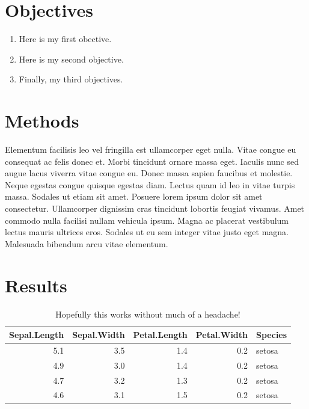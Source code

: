 \documentclass[article,30pt,extrafontsizes]{memoir}
\begin{document}
\begin{adjmulticols*}{3}{10mm}{10mm}
{\section{Objectives}\label{objectives}

\large

\begin{enumerate}
\def\labelenumi{\arabic{enumi}.}
\tightlist
\item
  Here is my first obective.
\item
  Here is my second objective.
\item
  Finally, my third objectives.
\end{enumerate}

\small

\section{Methods}\label{methods}

Elementum facilisis leo vel fringilla est ullamcorper eget nulla. Vitae
congue eu consequat ac felis donec et. Morbi tincidunt ornare massa
eget. Iaculis nunc sed augue lacus viverra vitae congue eu. Donec massa
sapien faucibus et molestie. Neque egestas congue quisque egestas diam.
Lectus quam id leo in vitae turpis massa. Sodales ut etiam sit amet.
Posuere lorem ipsum dolor sit amet consectetur. Ullamcorper dignissim
cras tincidunt lobortis feugiat vivamus. Amet commodo nulla facilisi
nullam vehicula ipsum. Magna ac placerat vestibulum lectus mauris
ultrices eros. Sodales ut eu sem integer vitae justo eget magna.
Malesuada bibendum arcu vitae elementum.

\section{Results}\label{results}

\begin{table}

\caption{\label{tab:unnamed-chunk-3}Hopefully this works without much of a headache!}
\centering
\begin{tabular}[t]{r|r|r|r|l}
\hline
Sepal.Length & Sepal.Width & Petal.Length & Petal.Width & Species\\
\hline
5.1 & 3.5 & 1.4 & 0.2 & setosa\\
\hline
4.9 & 3.0 & 1.4 & 0.2 & setosa\\
\hline
4.7 & 3.2 & 1.3 & 0.2 & setosa\\
\hline
4.6 & 3.1 & 1.5 & 0.2 & setosa\\
\hline
\end{tabular}
\end{table}

}
\end{adjmulticols*}
\end{document}
